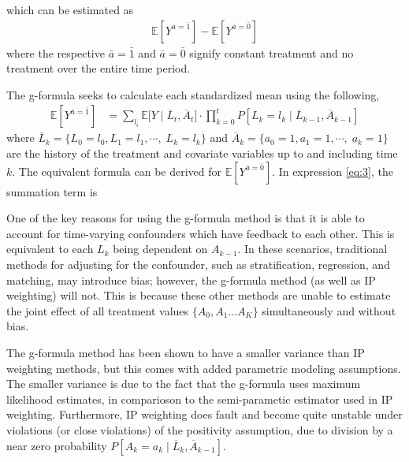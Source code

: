 which can be estimated as 
\begin{align} 
\mathbb{E}[Y^{\bar{a} = \bar{1}}] - \mathbb{E}[Y^{\bar{a} = \bar{0}}] 
\end{align} 
where the respective $\bar{a} = \bar{1}$ and $\bar{a} = \bar{0}$ signify constant treatment and no treatment over the entire time period.  

The g-formula seeks to calculate each standardized mean using the following, 
\begin{align} \label{eq:3} 
\mathbb{E}[Y^{\bar{a}= \bar{1}}] &= \sum_{l_i} \mathbb{E} \big[Y \mid  \overline{L}_{t}, \overline{A}_{t} \big]\cdot \prod_{k=0}^t P[L_k = l_k \mid \overline{L}_{k-1}, \overline{A}_{k-1}]
\end{align}
where $\overline{L}_k = \{L_{0} = l_0, L_{1} = l_1,  \cdots, \; L_{k} = l_k\}$ and $\overline{A}_k = \{a_{0} = 1, a_{1} = 1,  \cdots, \; a_{k} = 1\}$ are the history of the treatment and covariate variables up to and including time $k$.  The equivalent formula can be derived for $ \mathbb{E}[Y^{\bar{a} = \bar{0}}]$.   In expression \ref{eq:3}, the summation term is %

One of the key reasons for using the g-formula method is that it is able to account for time-varying confounders which have feedback to each other.  This is equivalent to each $L_k$ being dependent on $A_{k-1}$.\cite{robins1986new}  In these scenarios, traditional methods for adjusting for the confounder, such as stratification, regression, and matching, may introduce bias; however, the g-formula method (as well as IP weighting) will not.\cite{wright2015international}  This is because these other methods are unable to estimate the joint effect of all treatment values $\{A_0, A_1 \dots A_K \}$ simultaneously and without bias.\cite{fitzmaurice2008longitudinal}  

The g-formula method has been shown to have a smaller variance than IP weighting methods, but this comes with added parametric modeling assumptions.\cite{young2011comparative} The smaller variance is due to the fact that the g-formula uses maximum likelihood estimates, in comparioson to the semi-parametic estimator used in IP weighting. Furthermore, IP weighting does fault and become quite unstable under violations (or close violations) of the positivity assumption, due to division by a near zero probability $P[A_k=a_k \mid \overline{L}_k, \overline{A}_{k-1}]$.  

